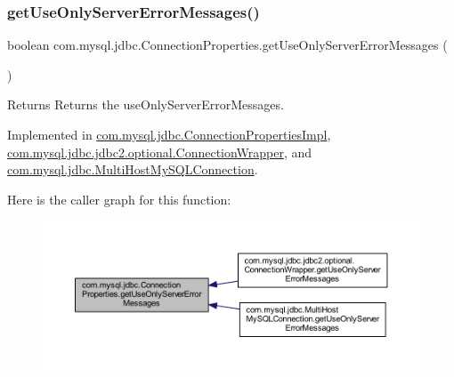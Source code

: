 \subsubsection{\texorpdfstring{get\+Use\+Only\+Server\+Error\+Messages()}{getUseOnlyServerErrorMessages()}}
{\footnotesize\ttfamily boolean com.\+mysql.\+jdbc.\+Connection\+Properties.\+get\+Use\+Only\+Server\+Error\+Messages (\begin{DoxyParamCaption}{ }\end{DoxyParamCaption})}

\begin{DoxyReturn}{Returns}
Returns the use\+Only\+Server\+Error\+Messages. 
\end{DoxyReturn}


Implemented in \mbox{\hyperlink{classcom_1_1mysql_1_1jdbc_1_1_connection_properties_impl_a443812dcf0ae5ad6249ffc5fa3bcf8a9}{com.\+mysql.\+jdbc.\+Connection\+Properties\+Impl}}, \mbox{\hyperlink{classcom_1_1mysql_1_1jdbc_1_1jdbc2_1_1optional_1_1_connection_wrapper_a0d102be23b8a849c3ffbc2412ee20615}{com.\+mysql.\+jdbc.\+jdbc2.\+optional.\+Connection\+Wrapper}}, and \mbox{\hyperlink{classcom_1_1mysql_1_1jdbc_1_1_multi_host_my_s_q_l_connection_a705ba324a046fb764066a5db3e967c47}{com.\+mysql.\+jdbc.\+Multi\+Host\+My\+S\+Q\+L\+Connection}}.

Here is the caller graph for this function\+:\nopagebreak
\begin{figure}[H]
\begin{center}
\leavevmode
\includegraphics[width=350pt]{interfacecom_1_1mysql_1_1jdbc_1_1_connection_properties_ae8e53bc10eb54dfdc635c30ff5efca90_icgraph}
\end{center}
\end{figure}
\mbox{\label{interfacecom_1_1mysql_1_1jdbc_1_1_connection_properties_abad9605452003baa9e6841a990334c92}} 
